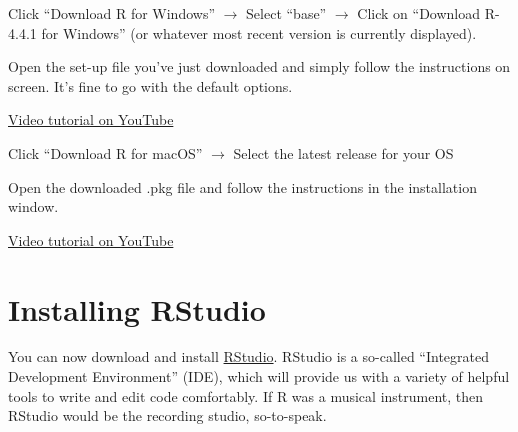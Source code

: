 \documentclass[
  11pt,
  letterpaper,
  DIV=11,
  numbers=noendperiod]{scrreprt}
\begin{document}
\begin{tcolorbox}[enhanced jigsaw, toprule=.15mm, opacitybacktitle=0.6, coltitle=black, arc=.35mm, colback=white, title=\textcolor{quarto-callout-note-color}{\faInfo}\hspace{0.5em}{Installation instructions for Windows users}, titlerule=0mm, toptitle=1mm, bottomtitle=1mm, breakable, rightrule=.15mm, opacityback=0, bottomrule=.15mm, leftrule=.75mm, colframe=quarto-callout-note-color-frame, left=2mm, colbacktitle=quarto-callout-note-color!10!white]

Click ``Download R for Windows'' \(\rightarrow\) Select ``base''
\(\rightarrow\) Click on ``Download R-4.4.1 for Windows'' (or whatever
most recent version is currently displayed).

Open the set-up file you've just downloaded and simply follow the
instructions on screen. It's fine to go with the default options.

\href{https://www.youtube.com/watch?v=mfGFv-iB724}{Video tutorial on
YouTube}

\end{tcolorbox}

\begin{tcolorbox}[enhanced jigsaw, toprule=.15mm, opacitybacktitle=0.6, coltitle=black, arc=.35mm, colback=white, title=\textcolor{quarto-callout-note-color}{\faInfo}\hspace{0.5em}{Installation instructions for MacOS users}, titlerule=0mm, toptitle=1mm, bottomtitle=1mm, breakable, rightrule=.15mm, opacityback=0, bottomrule=.15mm, leftrule=.75mm, colframe=quarto-callout-note-color-frame, left=2mm, colbacktitle=quarto-callout-note-color!10!white]

Click ``Download R for macOS'' \(\rightarrow\) Select the latest release
for your OS

Open the downloaded .pkg file and follow the instructions in the
installation window.

\href{https://www.youtube.com/watch?v=Icawuhf0Yqo}{Video tutorial on
YouTube}

\end{tcolorbox}

\section{Installing RStudio}\label{installing-rstudio}

You can now download and install
\href{https://posit.co/download/rstudio-desktop/}{RStudio}. RStudio is a
so-called ``Integrated Development Environment'' (IDE), which will
provide us with a variety of helpful tools to write and edit code
comfortably. If R was a musical instrument, then RStudio would be the
recording studio, so-to-speak.
\end{document}
